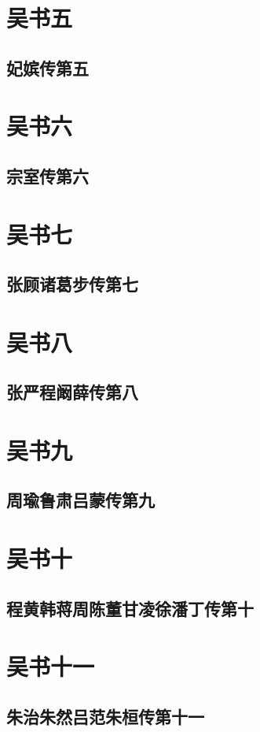 \documentclass[12pt,UTF8]{ctexbook}
\begin{document}
\part{吴书五}
\chapter{妃嫔传第五}

\part{吴书六}
\chapter{宗室传第六}

\part{吴书七}
\chapter{张顾诸葛步传第七}

\part{吴书八}
\chapter{张严程阚薛传第八}

\part{吴书九}
\chapter{周瑜鲁肃吕蒙传第九}

\part{吴书十}
\chapter{程黄韩蒋周陈董甘凌徐潘丁传第十}

\part{吴书十一}
\chapter{朱治朱然吕范朱桓传第十一}
\end{document}
